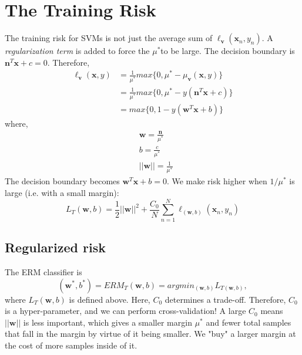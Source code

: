 \documentclass[titlepage, 12pt, leqno]{article}
\begin{document}
\pagebreak
\section{The Training Risk}
The training risk for SVMs is not just the average sum of $\ell_{\textbf{v}}
(\textbf{x}_{n},y_{n})$. A \textit{regularization term} is added to force the
$\mu^{*}$to be large. The decision boundary is $\textbf{n}^{T}\textbf{x}+c=0$.
Therefore,
\begin{align*}
    \ell_{\textbf{v}}(\textbf{x},y) &= \frac{1}{\mu^{*}}max\{0,\mu^{*} - 
    \mu_{\textbf{v}}(\textbf{x},y)\} \\
                                    &= \frac{1}{\mu^{*}}max\{0, \mu^{*} - 
                                    y(\textbf{n}^{T}\textbf{x}+c)\} \\
                                    &= max\{0, 1-y(\textbf{w}^{T}\textbf{x}+b)\}
\end{align*}
where,
\begin{align*}
    &\textbf{w} = \frac{\textbf{n}}{\mu^{*}} \\
    &b = \frac{c}{\mu^{*}}\\
    &||\textbf{w}|| = \frac{1}{\mu^{*}}
\end{align*}
The decision boundary becomes $\textbf{w}^{T}\textbf{x} + b = 0$.  We make risk
higher when $1/\mu^{*}$ is large (i.e. with a small margin):
\[
L_{T}(\textbf{w}, b) = \frac{1}{2}||\textbf{w}||^{2} + \frac{C_{0}}{N}
\sum_{n=1}^{N}\ell_{(\textbf{w},b)}(\textbf{x}_{n}, y_{n})
\]
\subsection{Regularized risk}
The ERM classifier is
\[
    (\textbf{w}^{*}, b^{*}) = ERM_{T}(\textbf{w},b) = argmin_{(\textbf{w},b)}
    L_{T(\textbf{w},b)},
\]
where $L_{T}(\textbf{w},b)$ is defined above. Here, $C_{0}$ determines a
trade-off. Therefore, $C_{0}$ is a hyper-parameter, and we can perform
cross-validation! A large $C_{0}$ means $||\textbf{w}||$ is less important,
which gives a smaller margin $\mu^{*}$ and fewer total samples that fall in the
margin by virtue of it being smaller. We "buy" a larger margin at the cost of
more samples inside of it.
\end{document}
